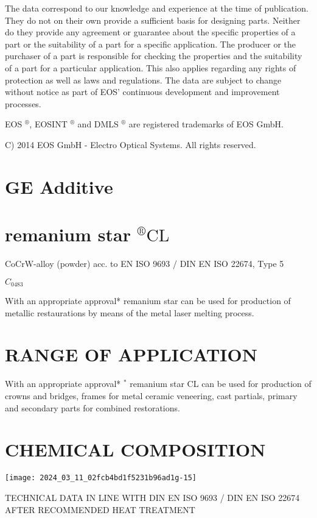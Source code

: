 \documentclass[10pt]{article}
\begin{document}
The data correspond to our knowledge and experience at the time of publication. They do not on their own provide a sufficient basis for designing parts. Neither do they provide any agreement or guarantee about the specific properties of a part or the suitability of a part for a specific application. The producer or the purchaser of a part is responsible for checking the properties and the suitability of a part for a particular application. This also applies regarding any rights of protection as well as laws and regulations. The data are subject to change without notice as part of EOS' continuous development and improvement processes.

EOS $^{\circledR}$, EOSINT $^{\circledR}$ and DMLS ${ }^{\circledR}$ are registered trademarks of EOS GmbH.

C) 2014 EOS GmbH - Electro Optical Systems. All rights reserved.

\section*{GE Additive}
\section*{remanium star ${ }^{\circledR} \mathrm{CL}$}
CoCrW-alloy (powder) acc. to EN ISO 9693 / DIN EN ISO 22674, Type 5

$C_{0483}$

With an appropriate approval* remanium star can be used for production of metallic restaurations by means of the metal laser melting process.

\section*{RANGE OF APPLICATION}
With an appropriate approval* ${ }^{*}$ remanium star CL can be used for production of crowns and bridges, frames for metal ceramic veneering, cast partials, primary and secondary parts for combined restorations.

\section*{CHEMICAL COMPOSITION}
\begin{center}
\texttt{[image: 2024\_03\_11\_02fcb4bd1f5231b96ad1g-15]}
\end{center}

TECHNICAL DATA IN LINE WITH DIN EN ISO 9693 / DIN EN ISO 22674 AFTER RECOMMENDED HEAT TREATMENT
\end{document}
